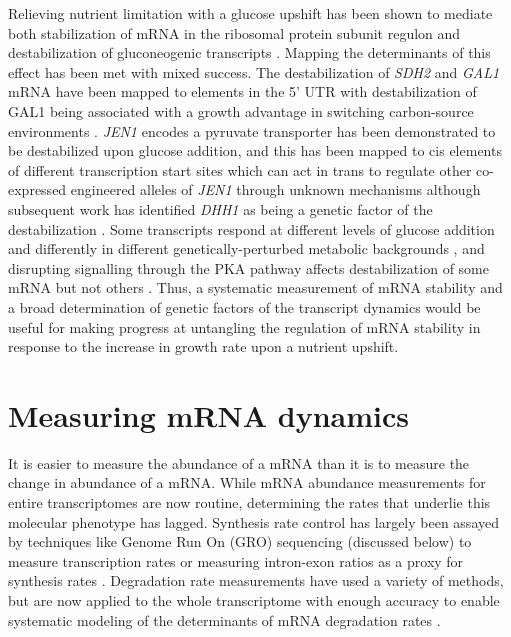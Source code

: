 Relieving nutrient limitation with a glucose upshift has
been shown to mediate both stabilization of mRNA in the ribosomal
protein subunit regulon 
\parencite{yin2003glucose}
and destabilization of
gluconeogenic transcripts 
\parencite{de2002role,mercado1994levels,scheffler1998control,lombardo1992control}. 
Mapping the
determinants of this effect has been met with mixed success. The
destabilization of \textit{SDH2} and \textit{GAL1} mRNA have been 
mapped to elements in the 5' UTR 
\parencite{scheffler1998control,bennett2008metabolic}
with destabilization of GAL1 being
associated with a growth advantage in switching carbon-source
environments \parencite{baumgartner2011antagonistic}. 
\textit{JEN1} encodes a pyruvate transporter has been demonstrated to
be destabilized upon glucose addition, and this has been mapped to cis
elements of different transcription start sites which can act in trans
to regulate other co-expressed engineered alleles of \textit{JEN1} through
unknown mechanisms 
\parencite{andrade2005multiple}
although subsequent work has
identified \textit{DHH1} as being a genetic factor of the destabilization 
\parencite{mota2014role}. 
Some transcripts respond at different levels of glucose
addition and differently in different genetically-perturbed metabolic
backgrounds 
\parencite{yin2000differential}, and disrupting signalling through the
PKA pathway affects destabilization of some mRNA but not others 
\parencite{yin2003glucose}. 
Thus, a systematic measurement of mRNA stability and a
broad determination of genetic factors of the transcript dynamics
would be useful for making progress at untangling the regulation of
mRNA stability in response to the increase in growth rate upon a
nutrient upshift.  

\section{Measuring mRNA dynamics}

It is easier to measure the abundance of a mRNA than it is to 
measure the change in abundance of a mRNA. While mRNA
abundance measurements for entire transcriptomes are now routine,
determining the rates that underlie this molecular phenotype has
lagged. Synthesis rate control has largely been assayed by techniques
like Genome Run On (GRO) sequencing (discussed below) to measure
transcription rates or measuring intron-exon ratios 
\parencite{gray2014snapshot} as a proxy for synthesis rates 
\parencite{perez2013eukaryotic}.
Degradation rate measurements have used a variety of methods, but are
now applied to the whole transcriptome with enough accuracy to enable
systematic modeling of the determinants of mRNA degradation rates
\parencite{perez2013eukaryotic,neymotin2016multiple,cheng2017cis}.

